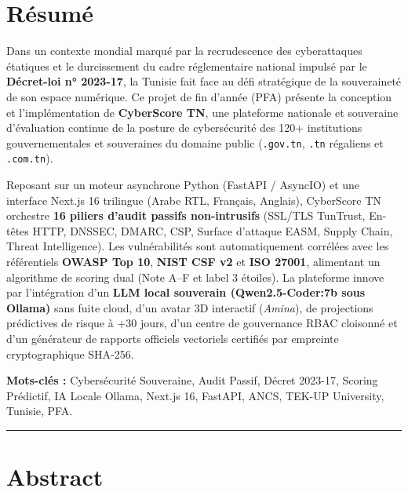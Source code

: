 \newpage
\thispagestyle{plain}

\section*{Résumé}

Dans un contexte mondial marqué par la recrudescence des cyberattaques étatiques et le durcissement du cadre réglementaire national impulsé par le \textbf{Décret-loi n° 2023-17}, la Tunisie fait face au défi stratégique de la souveraineté de son espace numérique. Ce projet de fin d'année (PFA) présente la conception et l'implémentation de \textbf{CyberScore TN}, une plateforme nationale et souveraine d'évaluation continue de la posture de cybersécurité des 120+ institutions gouvernementales et souveraines du domaine public (\texttt{.gov.tn}, \texttt{.tn} régaliens et \texttt{.com.tn}).

Reposant sur un moteur asynchrone Python (FastAPI / AsyncIO) et une interface Next.js 16 trilingue (Arabe RTL, Français, Anglais), CyberScore TN orchestre \textbf{16 piliers d'audit passifs non-intrusifs} (SSL/TLS TunTrust, En-têtes HTTP, DNSSEC, DMARC, CSP, Surface d'attaque EASM, Supply Chain, Threat Intelligence). Les vulnérabilités sont automatiquement corrélées avec les référentiels \textbf{OWASP Top 10}, \textbf{NIST CSF v2} et \textbf{ISO 27001}, alimentant un algorithme de scoring dual (Note A--F et label 3 étoiles). La plateforme innove par l'intégration d'un \textbf{LLM local souverain (Qwen2.5-Coder:7b sous Ollama)} sans fuite cloud, d'un avatar 3D interactif (\textit{Amina}), de projections prédictives de risque à +30 jours, d'un centre de gouvernance RBAC cloisonné et d'un générateur de rapports officiels vectoriels certifiés par empreinte cryptographique SHA-256.

\vspace{0.3cm}
\noindent\textbf{Mots-clés :} Cybersécurité Souveraine, Audit Passif, Décret 2023-17, Scoring Prédictif, IA Locale Ollama, Next.js 16, FastAPI, ANCS, TEK-UP University, Tunisie, PFA.

\vspace{0.8cm}
\hrule
\vspace{0.8cm}

\section*{Abstract}

